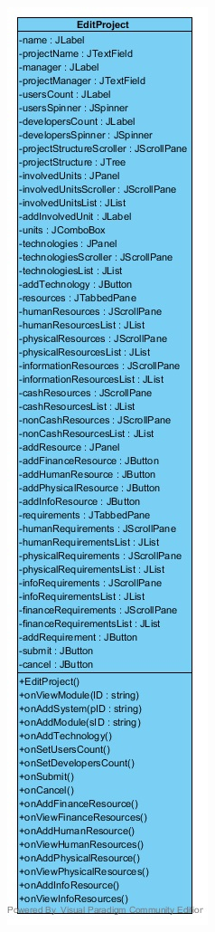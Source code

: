 \begin{figure}[H]
	\centering
	\begin{subfigure}[b]{0.3\textwidth}
		\includegraphics[width=\textwidth]{img/class-design/ui/EditProject.jpg}

\end{subfigure}
\end{figure}
